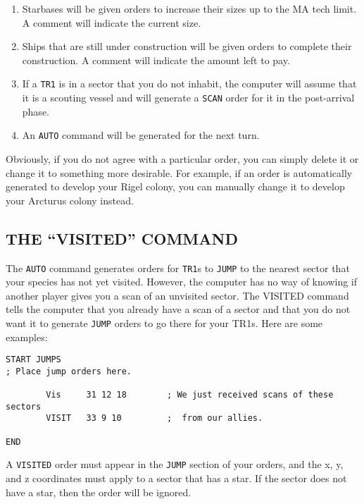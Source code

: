 \documentclass[10pt,titlepage]{article}
\begin{document}
\begin{enumerate}
	\item Starbases will be given orders to increase their sizes up
	to the MA tech limit.  A comment will indicate the current size.

	\item Ships that are still under construction will be given orders
	to complete their construction.  A comment will indicate the amount
	left to pay.

	\item If a \texttt{TR1} is in a sector that you do not inhabit, the computer
	will assume that it is a scouting vessel and will generate a
	\texttt{SCAN} order for it in the post-arrival phase.

	\item An \texttt{AUTO} command will be generated for the next turn.
\end{enumerate}
Obviously, if you do not agree with a particular order, you can simply delete
it or change it to something more desirable.   For example, if an order is
automatically generated to develop your Rigel colony, you can manually change
it to develop your Arcturus colony instead.


\subsection{THE ``VISITED'' COMMAND}
\label{sec:visitedcommand}


The \texttt{AUTO} command generates orders for \texttt{TR1}s to \texttt{JUMP} to the nearest sector that
your species has not yet visited.  However, the computer has no way of knowing
if another player gives you a scan of an unvisited sector.  The VISITED command
tells the computer that you already have a scan of a sector and that you do not
want it to generate \texttt{JUMP} orders to go there for your TR1s.  Here are some
examples:

\begin{verbatim}
START JUMPS
; Place jump orders here.

        Vis     31 12 18        ; We just received scans of these sectors
        VISIT   33 9 10         ;  from our allies.

END\end{verbatim} 


A \texttt{VISITED} order must appear in the \texttt{JUMP} section of your orders, and the x, y,
and z coordinates must apply to a sector that has a star.  If the sector does
not have a star, then the order will be ignored.
\end{document}
